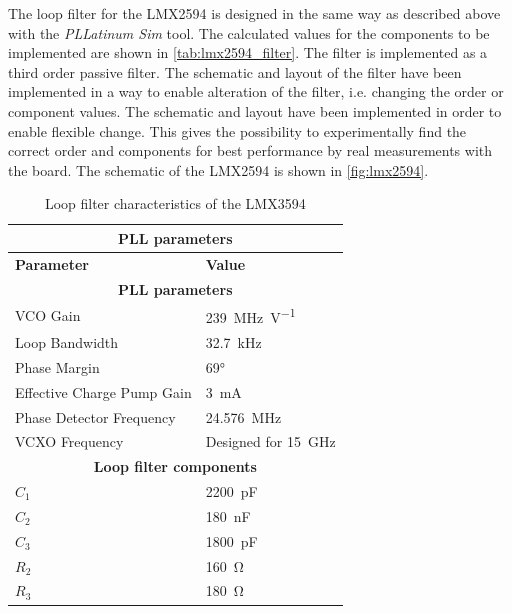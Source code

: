 The loop filter for the LMX2594 is designed in the same way as described above with the \textit{PLLatinum Sim} tool. 
The calculated values for the components to be implemented are shown in \autoref{tab:lmx2594_filter}.
The filter is implemented as a third order passive filter.
The schematic and layout of the filter have been implemented in a way to enable alteration of the filter, i.e. changing the order or component values.
The schematic and layout have been implemented in order to enable flexible change.
This gives the possibility to experimentally find the correct order and components for best performance by real measurements with the board.
The schematic of the LMX2594 is shown in \autoref{fig:lmx2594}.
\begin{table}[tbh]
	\caption[LMX2594 loop filter characteristics]{Loop filter characteristics of the LMX3594}
	\label{tab:lmx2594_filter}
	\centering
	\begin{tabularx}{\textwidth}{Xl}
		 \multicolumn{2}{c}{\textbf{PLL parameters}}                             \\
		\toprule
		\textbf{Parameter}                         & \textbf{Value}             \\ 
		\midrule
		\multicolumn{2}{c}{\textbf{PLL parameters}}                             \\
		VCO Gain                                   & \SI{239}{\MHz\per\volt}    \\
		Loop Bandwidth                             & \SI{32.7}{\kHz}            \\
		Phase Margin                               & \ang{69}                   \\
		Effective Charge Pump Gain                 & \SI{3}{\milli\ampere}      \\
		Phase Detector Frequency                   & \SI{24.576}{\MHz}          \\
		VCXO Frequency                             & Designed for \SI{15}{\GHz} \\
		[0.3cm]
		\multicolumn{2}{c}{\textbf{Loop filter components}}   \\                        
		$C_{1}$                          & \SI{2200}{\pico\farad}     \\
		$C_{2}$                          & \SI{180}{\nano\farad}      \\
		$C_{3}$                          & \SI{1800}{\pico\farad}     \\
		$R_{2}$                                    & \SI{160}{\ohm}             \\
		$R_{3}$                          & \SI{180}{\ohm}             \\ \bottomrule
	\end{tabularx}
\end{table}

